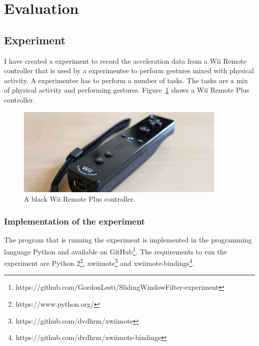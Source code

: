 \documentclass[runningheads,a4paper]{llncs}
\begin{document}
    \section{Evaluation}

    \subsection{Experiment}
    I have created a experiment to record the acceleration data from a Wii Remote controller that is used by a
    experimentee to perform gestures mixed with physical activity. A experimentee has to perform a number of tasks. The
    tasks are a mix of physical activity and performing gestures. Figure~\ref{fig:wii-remote} shows a Wii Remote Plus
    controller.

    \begin{figure}
        \centering
        \includegraphics[width=0.9\textwidth]{wii-remote-plus.jpg}
        \caption{A black Wii Remote Plus controller.}
        \label{fig:wii-remote}
    \end{figure}

    \subsubsection{Implementation of the experiment}
    The program that is running the experiment is implemented in the programming language Python and available on
    GitHub\footnote{https://github.com/GordonLesti/SlidingWindowFilter-experiment}. The requirements to run the
    experiment are Python 2\footnote{https://www.python.org/}, xwiimote\footnote{https://github.com/dvdhrm/xwiimote} and
    xwiimote-bindings\footnote{https://github.com/dvdhrm/xwiimote-bindings}.
\end{document}
